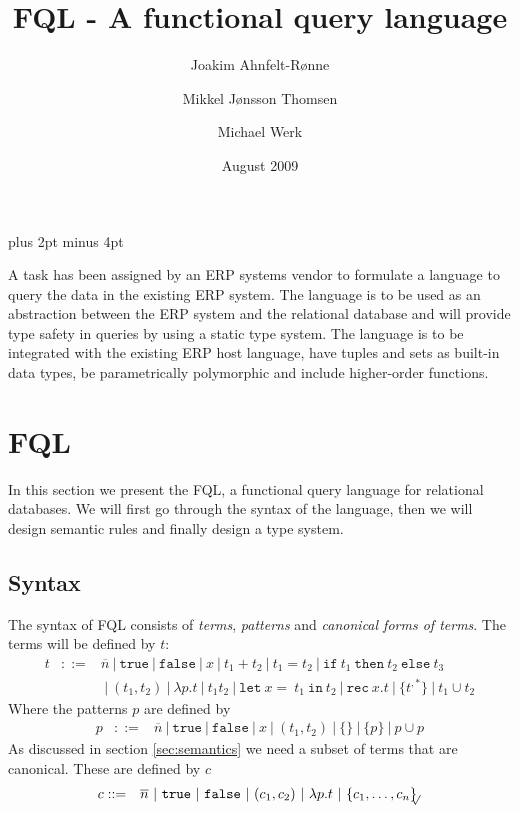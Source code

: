 \documentclass[a4paper]{article}
\title{FQL - A functional query language}
\date{August 2009}
\author{Joakim Ahnfelt-Rønne \and Mikkel Jønsson Thomsen \and Michael Werk}
\newcommand{\pipe}{\ | \ }
\newcommand{\s}[1]{\mathtt{#1}}
\newcommand{\sn}{\overline{n}}
\newcommand{\sLb}{\s{\{}}
\newcommand{\sRb}{\s{\}}}
\newcommand{\sif}{\s{if\ }}
\newcommand{\sthen}{\s{\ then\ }}
\newcommand{\selse}{\s{\ else\ }}
\newcommand{\sifthenelse}[3]{\sif #1 \sthen #2 \selse #3}
\newcommand{\sletin}[2]{\s{let\ } #1 \s{\ in\ } #2}
\newcommand{\srec}{\s{rec\ }}
\newcommand{\strue}{\s{true}}
\newcommand{\sfalse}{\s{false}}
\newcommand{\seq}{\s{=\ }}
\newcommand{\sset}[1]{\sLb #1 \sRb}
\newcommand{\ssetc}[1]{\sset{#1}_{\!\!\!\surd}}
\begin{document}
\parindent=0pt
\parskip=8pt plus 2pt minus 4pt
\maketitle

A task has been assigned by an ERP systems vendor to formulate a language to query the data in the existing ERP system. The language is to be used as an abstraction between the ERP system and the relational database and will provide type safety in queries by using a static type system. The language is to be integrated with the existing ERP host language, have tuples and sets as built-in data types, be parametrically polymorphic and include higher-order functions.


\section{FQL}
In this section we present the FQL, a functional query language for relational databases. We will first go through the syntax of the language, then we will design semantic rules and finally design a type system.

\subsection{Syntax}
The syntax of FQL consists of \emph{terms}, \emph{patterns} and \emph{canonical forms of terms}. The terms will be defined by $t$:
\begin{eqnarray*}
t & ::= & \sn \pipe \strue \pipe \sfalse \pipe x \pipe t_1 + t_2 \pipe t_1
= t_2 \pipe \sifthenelse{t_1}{t_2}{t_3} \\
& & \pipe (t_1,
t_2) \pipe \lambda p.t \pipe t_1 t_2 \pipe \sletin{x \seq t_1}{t_2}
\pipe \srec x.t \pipe \sset{t^{,*}} \pipe t_1 \cup t_2
\end{eqnarray*}
Where the patterns $p$ are defined by
\begin{eqnarray*}
p & ::= & \sn \pipe \strue \pipe \sfalse \pipe x \pipe (t_1, t_2) \pipe
\sset{} \pipe \sset{p} \pipe p \cup p
\end{eqnarray*}
As discussed in section \ref{sec:semantics} we need a subset of terms that are canonical. These are defined by $c$
\begin{eqnarray*}
c & ::= & \sn \pipe \strue \pipe \sfalse \pipe (c_1, c_2) \pipe \lambda
p.t \pipe \ssetc{c_1,\ldots,c_n}
\end{eqnarray*}
\end{document}
